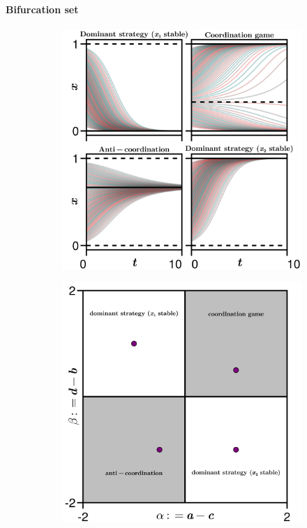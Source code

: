 \documentclass[../main.tex]{subfiles}
\begin{document}
\paragraph{Bifurcation set}\label{par:bif_set}

\begin{figure}[H]
    \centering 
    \begin{subfigure}[b]{0.495\textwidth}
        \centering 
        \includegraphics[keepaspectratio, width = \linewidth]{../figures/fig:autonomous_solutions.png}
        \caption{}
        \label{fig:autonomous_solutions}
    \end{subfigure}
    \hfill
    \begin{subfigure}[b]{0.495\textwidth}
        \centering 
        \includegraphics[keepaspectratio, width = \linewidth]{../figures/fig:autonomous_bifset.png}

\end{subfigure}
\end{figure}
\end{document}
